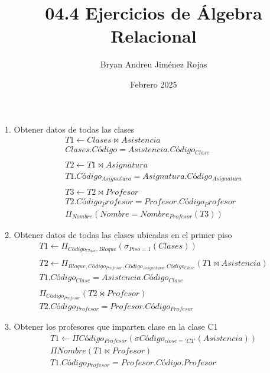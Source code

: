 \documentclass{article}
\title{04.4 Ejercicios de Álgebra Relacional}
\author{Bryan Andreu Jiménez Rojas}
\date{Febrero 2025}
\begin{document}
\maketitle

\textnormal{1. Obtener datos de todas las clases}
\begin{equation*}
	\begin{split}
		T1 \leftarrow Clases \bowtie Asistencia \\
		Clases.Código = Asistencia.Código_{Clase}
		\\\\
		T2 \leftarrow T1 \bowtie Asignatura \\
		T1.Código_{Asignatura} = Asignatura.Código_{Asignatura}
		\\\\
		T3 \leftarrow T2 \bowtie Profesor \\
		T2.Código_Profesor = Profesor.Código_Profesor \\
		\Pi_{Nombre}\left(Nombre = Nombre_{Profesor}\left(T3\right)\right)
	\end{split}
\end{equation*}

\textnormal{2. Obtener datos de todas las clases ubicadas en el primer piso}
\begin{equation*}
	\begin{split}
		T1 \leftarrow \Pi_{Código_{Clase}, Bloque} \left(\sigma_{Piso = 1}\left(Clases\right)\right)
		\\\\
		T2 \leftarrow \Pi_{Bloque, Código_{Profesor}, Código_{Asignatura}, Código_{Clase}}\left(T1 \bowtie Asistencia\right) \\
		T1.Código_{Clase} = Asistencia.Código_{Clase}
		\\\\
		\Pi_{Código_{Profesor}}\left(T2 \bowtie Profesor\right) \\
		T2.Código_{Profesor} = Profesor.Código_{Profesor}
	\end{split}
\end{equation*}

\textnormal{3. Obtener los profesores que imparten clase en la clase C1}
\begin{equation*}
	\begin{split}
		T1 \leftarrow \Pi Código_{Profesor}\left(\sigma Código_{close = 'C1'}(Asistencia)\right) \\
		\Pi Nombre \left(T1 \bowtie Profesor\right) \\
		T1.Código_{Profesor} = Profesor.Código.Profesor
	\end{split}
\end{equation*}
\end{document}
